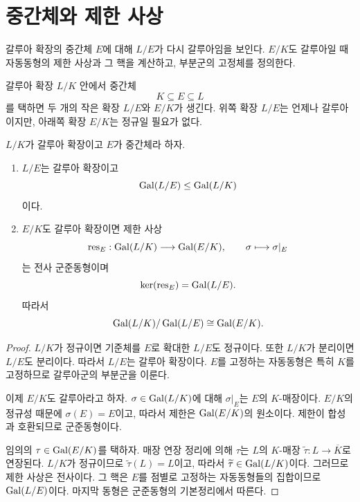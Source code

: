 \clearpage
\section{중간체와 제한 사상}
\label{sec:galois-intermediate-restriction}

\begin{learninggoal}
갈루아 확장의 중간체 $E$에 대해 $L/E$가 다시 갈루아임을 보인다. $E/K$도 갈루아일 때 자동동형의 제한 사상과 그 핵을 계산하고, 부분군의 고정체를 정의한다.
\end{learninggoal}

갈루아 확장 $L/K$ 안에서 중간체
\[
  K\subseteq E\subseteq L
\]
를 택하면 두 개의 작은 확장 $L/E$와 $E/K$가 생긴다. 위쪽 확장 $L/E$는 언제나 갈루아이지만, 아래쪽 확장 $E/K$는 정규일 필요가 없다.

\begin{theorem}
$L/K$가 갈루아 확장이고 $E$가 중간체라 하자.
\begin{enumerate}[label=(\roman*)]
  \item $L/E$는 갈루아 확장이고
  \[
    \operatorname{Gal}(L/E)\le\operatorname{Gal}(L/K)
  \]
  이다.
  \item $E/K$도 갈루아 확장이면 제한 사상
  \[
    \operatorname{res}_E:\operatorname{Gal}(L/K)\longrightarrow\operatorname{Gal}(E/K),
    \qquad
    \sigma\longmapsto\sigma|_E
  \]
  는 전사 군준동형이며
  \[
    \ker(\operatorname{res}_E)=\operatorname{Gal}(L/E).
  \]
  따라서
  \[
    \operatorname{Gal}(L/K)/\operatorname{Gal}(L/E)
    \cong\operatorname{Gal}(E/K).
  \]
\end{enumerate}
\end{theorem}

\begin{proof}
$L/K$가 정규이면 기준체를 $E$로 확대한 $L/E$도 정규이다. 또한 $L/K$가 분리이면 $L/E$도 분리이다. 따라서 $L/E$는 갈루아 확장이다. $E$를 고정하는 자동동형은 특히 $K$를 고정하므로 갈루아군의 부분군을 이룬다.

이제 $E/K$도 갈루아라고 하자. $\sigma\in\operatorname{Gal}(L/K)$에 대해 $\sigma|_E$는 $E$의 $K$-매장이다. $E/K$의 정규성 때문에 $\sigma(E)=E$이고, 따라서 제한은 $\operatorname{Gal}(E/K)$의 원소이다. 제한이 합성과 호환되므로 군준동형이다.

임의의 $\tau\in\operatorname{Gal}(E/K)$를 택하자. 매장 연장 정리에 의해 $\tau$는 $L$의 $K$-매장 $\widetilde\tau:L\to\overline K$로 연장된다. $L/K$가 정규이므로 $\widetilde\tau(L)=L$이고, 따라서 $\widetilde\tau\in\operatorname{Gal}(L/K)$이다. 그러므로 제한 사상은 전사이다. 그 핵은 $E$를 점별로 고정하는 자동동형들의 집합이므로 $\operatorname{Gal}(L/E)$이다. 마지막 동형은 군준동형의 기본정리에서 따른다.
\end{proof}

